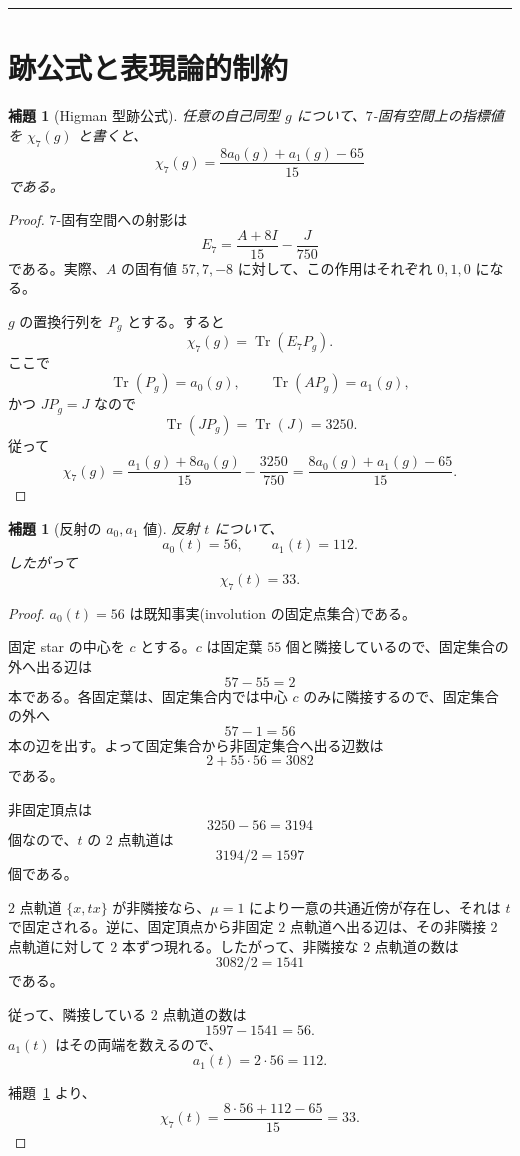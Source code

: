 \documentclass[11pt,a4paper]{article}
\theoremstyle{plain}
\newtheorem{lemma}[theorem]{補題}
\theoremstyle{definition}
\theoremstyle{remark}
\DeclareMathOperator{\Tr}{Tr}
\begin{document}
\bigskip
\hrule
\bigskip

\section{跡公式と表現論的制約}

\begin{lemma}[Higman 型跡公式]\label{lem:Higman}
任意の自己同型 $g$ について、$7$-固有空間上の指標値を $\chi_7(g)$ と書くと、
\[
\chi_7(g) = \frac{8 a_0(g) + a_1(g) - 65}{15}
\]
である。
\end{lemma}

\begin{proof}
$7$-固有空間への射影は
\[
E_7 = \frac{A + 8I}{15} - \frac{J}{750}
\]
である。実際、$A$ の固有値 $57,7,-8$ に対して、この作用はそれぞれ $0,1,0$ になる。

$g$ の置換行列を $P_g$ とする。すると
\[
\chi_7(g) = \Tr(E_7 P_g).
\]
ここで
\[
\Tr(P_g) = a_0(g), \qquad
\Tr(A P_g) = a_1(g),
\]
かつ $J P_g = J$ なので
\[
\Tr(J P_g) = \Tr(J) = 3250.
\]
従って
\[
\chi_7(g) = \frac{a_1(g) + 8 a_0(g)}{15} - \frac{3250}{750} = \frac{8 a_0(g) + a_1(g) - 65}{15}.
\]
\end{proof}

\begin{lemma}[反射の $a_0, a_1$ 値]\label{lem:reflection}
反射 $t$ について、
\[
a_0(t) = 56, \qquad a_1(t) = 112.
\]
したがって
\[
\chi_7(t) = 33.
\]
\end{lemma}

\begin{proof}
$a_0(t) = 56$ は既知事実(involution の固定点集合)である。

固定 star の中心を $c$ とする。$c$ は固定葉 $55$ 個と隣接しているので、固定集合の外へ出る辺は
\[
57 - 55 = 2
\]
本である。各固定葉は、固定集合内では中心 $c$ のみに隣接するので、固定集合の外へ
\[
57 - 1 = 56
\]
本の辺を出す。よって固定集合から非固定集合へ出る辺数は
\[
2 + 55 \cdot 56 = 3082
\]
である。

非固定頂点は
\[
3250 - 56 = 3194
\]
個なので、$t$ の $2$ 点軌道は
\[
3194 / 2 = 1597
\]
個である。

$2$ 点軌道 $\{x, tx\}$ が非隣接なら、$\mu = 1$ により一意の共通近傍が存在し、それは $t$ で固定される。逆に、固定頂点から非固定 $2$ 点軌道へ出る辺は、その非隣接 $2$ 点軌道に対して $2$ 本ずつ現れる。したがって、非隣接な $2$ 点軌道の数は
\[
3082 / 2 = 1541
\]
である。

従って、隣接している $2$ 点軌道の数は
\[
1597 - 1541 = 56.
\]
$a_1(t)$ はその両端を数えるので、
\[
a_1(t) = 2 \cdot 56 = 112.
\]

補題~\ref{lem:Higman} より、
\[
\chi_7(t) = \frac{8 \cdot 56 + 112 - 65}{15} = 33.
\]
\end{proof}
\end{document}
